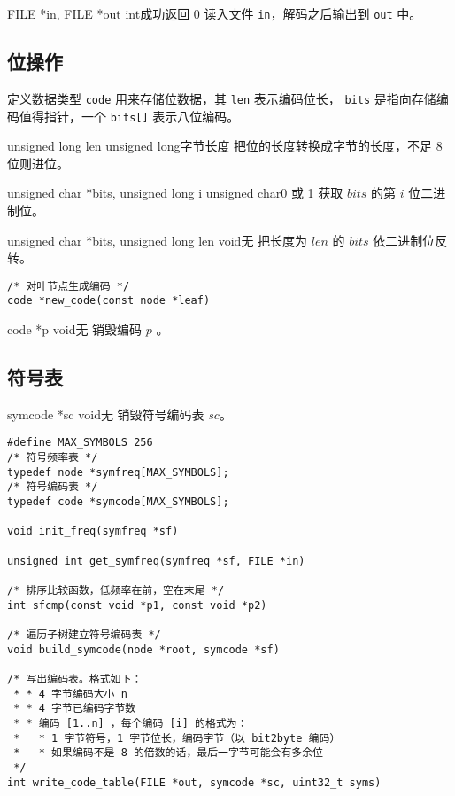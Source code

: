 {FILE *in, FILE *out}
{int}{成功返回 0}
{读入文件 {\tt in}，解码之后输出到 {\tt out} 中。}

\subsection{位操作}

\begin{center}
\end{center}

定义数据类型 \verb|code| 用来存储位数据，其 \verb|len| 表示编码位长， \verb|bits| 是指向存储编码值得指针，一个 \verb|bits[]| 表示八位编码。

{unsigned long len}
{unsigned long}{字节长度}
{把位的长度转换成字节的长度，不足 8 位则进位。}

{unsigned char *bits, unsigned long i}
{unsigned char}{0 或 1}
{获取 $bits$ 的第 $i$ 位二进制位。}

{unsigned char *bits, unsigned long len}
{void}{无}
{把长度为 $len$ 的 $bits$ 依二进制位反转。}

\begin{verbatim}
/* 对叶节点生成编码 */
code *new_code(const node *leaf)
\end{verbatim}

{code *p}
{void}{无}
{销毁编码 $p$ 。}

\subsection{符号表}

{symcode *sc}
{void}{无}
{销毁符号编码表 $sc$。}

\begin{verbatim}
#define MAX_SYMBOLS 256
/* 符号频率表 */
typedef node *symfreq[MAX_SYMBOLS];
/* 符号编码表 */
typedef code *symcode[MAX_SYMBOLS];

void init_freq(symfreq *sf)

unsigned int get_symfreq(symfreq *sf, FILE *in)

/* 排序比较函数，低频率在前，空在末尾 */
int sfcmp(const void *p1, const void *p2)

/* 遍历子树建立符号编码表 */
void build_symcode(node *root, symcode *sf)

/* 写出编码表。格式如下：
 * * 4 字节编码大小 n
 * * 4 字节已编码字节数
 * * 编码 [1..n] ，每个编码 [i] 的格式为：
 *   * 1 字节符号，1 字节位长，编码字节（以 bit2byte 编码）
 *   * 如果编码不是 8 的倍数的话，最后一字节可能会有多余位
 */
int write_code_table(FILE *out, symcode *sc, uint32_t syms)
\end{verbatim}

